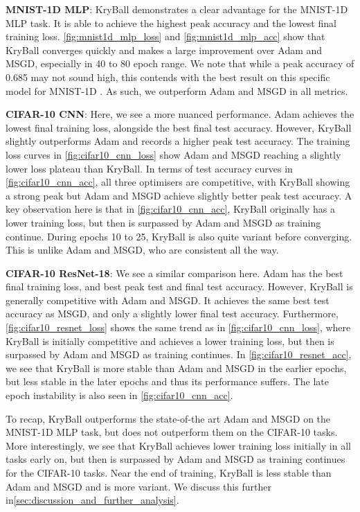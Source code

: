 \textbf{MNIST-1D MLP}: KryBall demonstrates a clear advantage for the MNIST-1D MLP task. It is able to achieve the highest peak accuracy and the lowest final training loss. \cref{fig:mnist1d_mlp_loss} and \cref{fig:mnist1d_mlp_acc} show that KryBall converges quickly and makes a large improvement over Adam and MSGD, especially in 40 to 80 epoch range. We note that while a peak accuracy of 0.685 may not sound high, this contends with the best result on this specific model for MNIST-1D \cite{greydanus_mnist1d}. As such, we outperform Adam and MSGD in all metrics.

\textbf{CIFAR-10 CNN}: Here, we see a more nuanced performance. Adam achieves the lowest final training loss, alongside the best final test accuracy. However, KryBall slightly outperforms Adam and records a higher peak test accuracy. The training loss curves in \cref{fig:cifar10_cnn_loss} show Adam and MSGD reaching a slightly lower loss plateau than KryBall. In terms of test accuracy curves in \cref{fig:cifar10_cnn_acc}, all three optimisers are competitive, with KryBall showing a strong peak but Adam and MSGD achieve slightly better peak test accuracy. A key observation here is that in \cref{fig:cifar10_cnn_acc}, KryBall originally has a lower training loss, but then is surpassed by Adam and MSGD as training continue. During epochs 10 to 25, KryBall is also quite variant before converging. This is unlike Adam and MSGD, who are consistent all the way. 

\textbf{CIFAR-10 ResNet-18}: We see a similar comparison here. Adam has the best final training loss, and best peak test and final test accuracy. However, KryBall is generally competitive with Adam and MSGD. It achieves the same best test accuracy as MSGD, and only a slightly lower final test accuracy. Furthermore, \cref{fig:cifar10_resnet_loss} shows the same trend as in \cref{fig:cifar10_cnn_loss}, where KryBall is initially competitive and achieves a lower training loss, but then is surpassed by Adam and MSGD as training continues. In \cref{fig:cifar10_resnet_acc}, we see that KryBall is more stable than Adam and MSGD in the earlier epochs, but less stable in the later epochs and thus its performance suffers. The late epoch instability is also seen in \cref{fig:cifar10_cnn_acc}. 

To recap, KryBall outperforms the state-of-the art Adam and MSGD on the MNIST-1D MLP task, but does not outperform them on the CIFAR-10 tasks. More interestingly, we see that KryBall achieves lower training loss initially in all tasks early on, but then is surpassed by Adam and MSGD as training continues for the CIFAR-10 tasks. Near the end of training, KryBall is less stable than Adam and MSGD and is more variant. We discuss this further in\cref{sec:discussion_and_further_analysis}.

